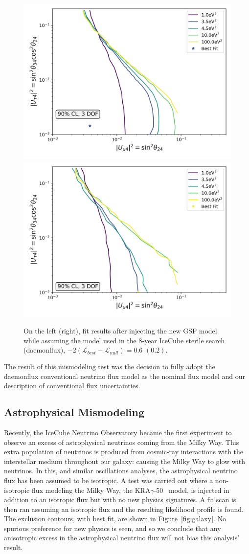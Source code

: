 \documentclass[main.tex]{subfiles}
\begin{document}
\begin{figure}  
    \centering
    \includegraphics[width=0.45\linewidth]{figures/gsfinject_fitbarr_Realization_gsfdaemon_Asimov_sterile_0_cl0.9_dof3.png}
    \includegraphics[width=0.45\linewidth]{figures/gsfinject_fitdaemon_Realization_gsfdaemon_Asimov_sterile_0_cl0.9_dof3.png}
    \caption{On the left (right), fit results after injecting the new GSF model while assuming the model used in the 8-year IceCube sterile search (daemonflux), $-2(\mathcal{L}_{best}-\mathcal{L}_{null})=0.6$ $(0.2)$.}\label{fig:gsf_updates}
\end{figure}

The result of this mismodeling test was the decision to fully adopt the daemonflux conventional neutrino flux model as the nominal flux model and our description of conventional flux uncertainties. 

\subsection{Astrophysical Mismodeling}

Recently, the IceCube Neutrino Observatory became the first experiment to observe an excess of astrophysical neutrinos coming from the Milky Way\cite{doi:10.1126/science.adc9818}. 
This extra population of neutrinos is produced from cosmic-ray interactions with the interstellar medium throughout our galaxy: causing the Milky Way to glow with neutrinos. 
In this, and similar oscillations analyses, the astrophysical neutrino flux has been assumed to be isotropic. 
A test was carried out where a non-isotropic flux modeling the Milky Way, the KRA$\gamma$-50~\cite{Gaggero_2015} model, is injected in addition to an isotropic flux but with no new physics signatures. 
A fit scan is then ran assuming an isotropic flux and the resulting likelihood profile is found. 
The exclusion contours, with best fit, are shown in Figure~\ref{fig:galaxy}.
No spurious preference for new physics is seen, and so we conclude that any anisotropic excess in the astrophysical neutrino flux will not bias this analysis' result. 
\end{document}
